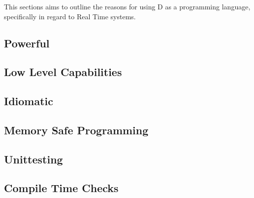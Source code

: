 This sections aims to outline the reasons for using D as a programming language,
specifically in regard to Real Time systems. 

\subsection{Powerful}

\subsection{Low Level Capabilities}

\subsection{Idiomatic}

\subsection{Memory Safe Programming}

\subsection{Unittesting}

\subsection{Compile Time Checks}


